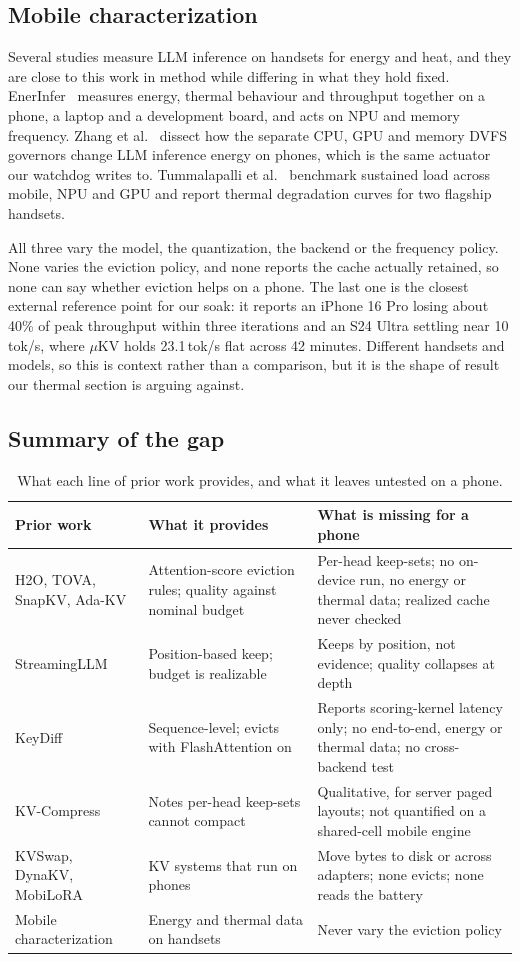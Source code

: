 \documentclass[11pt]{article}
\begin{document}
\subsection{Mobile characterization}
Several studies measure LLM inference on handsets for energy and heat, and they are close to
this work in method while differing in what they hold fixed. EnerInfer~\cite{enerinfer}
measures energy, thermal behaviour and throughput together on a phone, a laptop and a
development board, and acts on NPU and memory frequency. Zhang et al.~\cite{dvfsgov} dissect
how the separate CPU, GPU and memory DVFS governors change LLM inference energy on
phones, which is the same actuator our watchdog writes to. Tummalapalli et
al.~\cite{edgesustained} benchmark sustained load across mobile, NPU and GPU and report
thermal degradation curves for two flagship handsets.

All three vary the model, the quantization, the backend or the frequency policy. None varies
the eviction policy, and none reports the cache actually retained, so none can say whether
eviction helps on a phone. The last one is the closest external reference point for our soak:
it reports an iPhone 16 Pro losing about 40\% of peak throughput within three iterations and an
S24 Ultra settling near 10\,tok/s, where $\mu$KV holds 23.1\,tok/s flat across 42 minutes.
Different handsets and models, so this is context rather than a comparison, but it is the shape
of result our thermal section is arguing against.

\subsection{Summary of the gap}
\begin{table}[h]\centering\small
\caption{What each line of prior work provides, and what it leaves untested on a phone.}
\label{tab:gap}
\begin{tabular}{@{}p{3.3cm}p{4.5cm}p{5.9cm}@{}}
\toprule
\textbf{Prior work} & \textbf{What it provides} & \textbf{What is missing for a phone}\\
\midrule
H2O, TOVA, SnapKV, Ada-KV & Attention-score eviction rules; quality against nominal budget
& Per-head keep-sets; no on-device run, no energy or thermal data; realized cache never checked\\
StreamingLLM & Position-based keep; budget is realizable
& Keeps by position, not evidence; quality collapses at depth\\
KeyDiff & Sequence-level; evicts with FlashAttention on
& Reports scoring-kernel latency only; no end-to-end, energy or thermal data; no cross-backend test\\
KV-Compress & Notes per-head keep-sets cannot compact
& Qualitative, for server paged layouts; not quantified on a shared-cell mobile engine\\
KVSwap, DynaKV, MobiLoRA & KV systems that run on phones
& Move bytes to disk or across adapters; none evicts; none reads the battery\\
Mobile characterization & Energy and thermal data on handsets
& Never vary the eviction policy\\
\bottomrule
\end{tabular}
\end{table}
\end{document}
